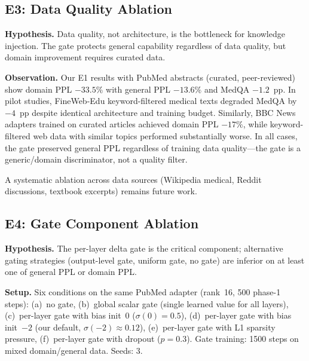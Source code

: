 \documentclass{article}
\begin{document}
\subsection{E3: Data Quality Ablation}
\label{sec:e3}

\textbf{Hypothesis.} Data quality, not architecture, is the bottleneck
for knowledge injection. The gate protects general capability regardless
of data quality, but domain improvement requires curated data.

\textbf{Observation.} Our E1 results with PubMed abstracts (curated,
peer-reviewed) show domain PPL $-33.5\%$ with general PPL $-13.6\%$
and MedQA $-1.2$~pp. In pilot studies, FineWeb-Edu keyword-filtered
medical texts degraded MedQA by $-4$~pp despite identical architecture
and training budget. Similarly, BBC News adapters trained on curated
articles achieved domain PPL $-17\%$, while keyword-filtered web data
with similar topics performed substantially worse. In all cases, the
gate preserved general PPL regardless of training data quality---the
gate is a generic/domain discriminator, not a quality filter.

A systematic ablation across data sources (Wikipedia medical, Reddit
discussions, textbook excerpts) remains future work.

\subsection{E4: Gate Component Ablation}
\label{sec:e4}

\textbf{Hypothesis.} The per-layer delta gate is the critical component;
alternative gating strategies (output-level gate, uniform gate, no gate)
are inferior on at least one of general PPL or domain PPL.

\textbf{Setup.} Six conditions on the same PubMed adapter (rank~16,
500 phase-1 steps): (a)~no gate, (b)~global scalar gate (single
learned value for all layers), (c)~per-layer gate with bias init~0
($\sigma(0)=0.5$), (d)~per-layer gate with bias init~$-2$ (our
default, $\sigma(-2)\approx0.12$), (e)~per-layer gate with L1 sparsity
pressure, (f)~per-layer gate with dropout ($p{=}0.3$).
Gate training: 1500 steps on mixed domain/general data. Seeds: 3.

\end{document}
